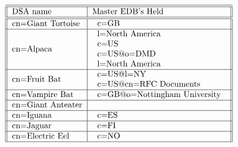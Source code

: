 
\begin{table}
\caption{DSAs at the Root Level}
\small
\[
\begin{tabular}{||l|l||} \hline\hline
DSA name 		& Master EDB's Held \\ \hline\hline	
cn=Giant Tortoise
           &\begin{tabular}{l}
           c=GB \\
           \end{tabular}\\ \hline
cn=Alpaca
           &\begin{tabular}{l}
           l=North America \\
           c=US \\
           c=US@o=DMD \\
	   l=North America \\
           \end{tabular}\\ \hline
cn=Fruit Bat
           &\begin{tabular}{l}
           c=US@l=NY \\
           c=US@cn=RFC Documents \\
           \end{tabular}\\ \hline
cn=Vampire Bat
           &\begin{tabular}{l}
           c=GB@o=Nottingham University \\
           \end{tabular}\\ \hline
cn=Giant Anteater
           &\begin{tabular}{l}
           \end{tabular}\\ \hline
cn=Iguana
           &\begin{tabular}{l}
           c=ES \\
           \end{tabular}\\ \hline
cn=Jaguar
           &\begin{tabular}{l}
           c=FI \\
           \end{tabular}\\ \hline
cn=Electric Eel
           &\begin{tabular}{l}
           c=NO \\
           \end{tabular}\\ \hline

\end{tabular}\]
\end{table}
